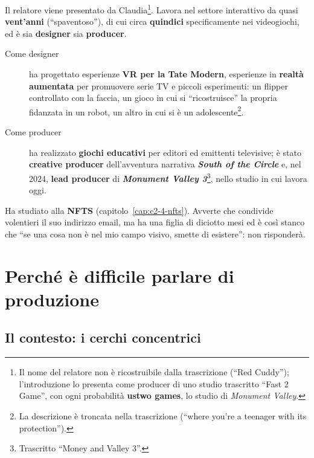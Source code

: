 Il relatore viene presentato da Claudia\footnote{Il nome del relatore non è
ricostruibile dalla trascrizione (``Red Cuddy''); l'introduzione lo presenta come
producer di uno studio trascritto ``Fast 2 Game'', con ogni probabilità
\textbf{ustwo games}, lo studio di \emph{Monument Valley}.}. Lavora nel settore
interattivo da quasi \textbf{vent'anni} (``spaventoso''), di cui circa
\textbf{quindici} specificamente nei videogiochi, ed è sia \textbf{designer} sia
\textbf{producer}.
\begin{description}
  \item[Come designer] ha progettato esperienze \textbf{VR per la Tate Modern},
        esperienze in \textbf{realtà aumentata} per promuovere serie TV e piccoli
        esperimenti: un flipper controllato con la faccia, un gioco in cui si
        ``ricostruisce'' la propria fidanzata in un robot, un altro in cui si è un
        adolescente\footnote{La descrizione è troncata nella trascrizione (``where
        you're a teenager with its protection'').}.
  \item[Come producer] ha realizzato \textbf{giochi educativi} per editori ed
        emittenti televisive; è stato \textbf{creative producer} dell'avventura
        narrativa \textbf{\emph{South of the Circle}} e, nel 2024, \textbf{lead
        producer} di \textbf{\emph{Monument Valley 3}}\footnote{Trascritto ``Money
        and Valley 3''.}, nello studio in cui lavora oggi.
\end{description}
Ha studiato alla \textbf{NFTS} (capitolo~\ref{cap:c2-4-nfts}). Avverte che
condivide volentieri il suo indirizzo email, ma ha una figlia di diciotto mesi ed è
così stanco che ``se una cosa non è nel mio campo visivo, smette di esistere'': non
risponderà.

\section{Perché è difficile parlare di produzione}
\label{sec:c3-3-difficile}

\subsection{Il contesto: i cerchi concentrici}

